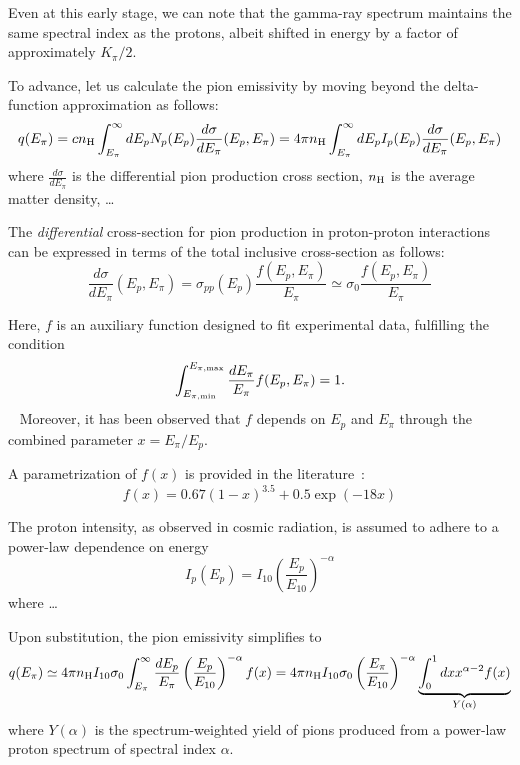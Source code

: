 Even at this early stage, we can note that the gamma-ray spectrum maintains the same spectral index as the protons, albeit shifted in energy by a factor of approximately \( K_\pi / 2 \).

To advance, let us calculate the pion emissivity by moving beyond the delta-function approximation as follows:
%
\begin{equation}
q(E_\pi) = c n_{\rm H} \int_{E_\pi}^\infty dE_p N_p (E_p) \frac{d\sigma}{dE_\pi}(E_p, E_\pi) 
= 4 \pi n_{\rm H} \int_{E_\pi}^\infty dE_p I_p (E_p) \frac{d\sigma}{dE_\pi}(E_p, E_\pi)
\end{equation}
%
where $\frac{d\sigma}{dE_\pi}$ is the differential pion production cross section, $n_{\rm H}$ is the average matter density, \dots

The \emph{differential} cross-section for pion production in proton-proton interactions can be expressed in terms of the total inclusive cross-section as follows:
%
\begin{equation}
\frac{d\sigma}{dE_\pi}(E_p, E_\pi) = \sigma_{pp}(E_p) \frac{f(E_p, E_\pi)}{E_\pi} \simeq \sigma_{0} \frac{f(E_p, E_\pi)}{E_\pi} 
\end{equation}

Here, \(f\) is an auxiliary function designed to fit experimental data, fulfilling the condition 
%
\begin{equation}
\int_{E_{\rm \pi,min}}^{E_{\rm \pi,max}} \frac{dE_\pi}{E_\pi} f(E_p, E_\pi) = 1. 
\end{equation}
%
~
%
Moreover, it has been observed that $f$ depends on \(E_p\) and \(E_\pi\) through the combined parameter \(x = E_\pi / E_p\). 

A parametrization of \(f(x)\) is provided in the literature~\cite{Berezinskii1988sal}:
%
\begin{equation}
f(x) = 0.67 (1-x)^{3.5} + 0.5 \exp(-18 x)
\end{equation}

The proton intensity, as observed in cosmic radiation, is assumed to adhere to a power-law dependence on energy
%
\begin{equation}
I_p(E_p) = I_{10} \left(\frac{E_p}{E_{10}}\right)^{-\alpha}
\end{equation}
%
where \dots

Upon substitution, the pion emissivity simplifies to
%
\begin{equation}
q(E_\pi) \simeq 4 \pi n_{\rm H} I_{10} \sigma_0 \int_{E_\pi}^\infty \frac{dE_p}{E_\pi} \left(\frac{E_p}{E_{10}} \right)^{-\alpha} f(x) = 4 \pi n_{\rm H} I_{10} \sigma_0 \left(\frac{E_\pi}{E_{10}} \right)^{-\alpha} \underbrace{ \int_0^1 dx x^{\alpha-2} f(x)}_{Y(\alpha)}
\end{equation}
%
where $Y(\alpha)$ is the spectrum-weighted yield of pions produced from a power-law proton spectrum of spectral index $\alpha$.


